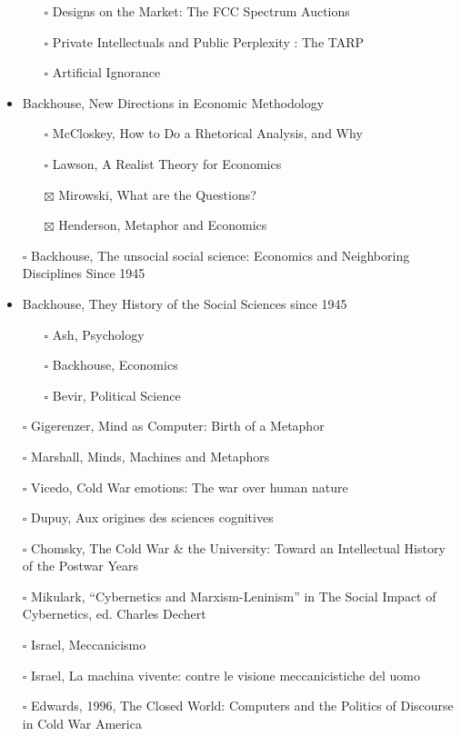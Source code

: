 \documentclass[paper=B6,portrait,twoside=true,twocolumn=false,headinclude=true,footinclude=false,fontsize=12,BCOR=10mm,DIV=calc,pagesize=auto,titlepage=firstiscover,mpinclude=false,headings=normal,headings=twolinechapter,open=right,toc=graduated,chapterprefix=false,numbers=endperiod,parskip=half+]{scrbook}
\theoremstyle{definition}
\begin{document}
\begin{itemize}
\begin{itemize}
\item[{$\square$}] Designs on the Market: The FCC Spectrum Auctions
\item[{$\square$}] Private Intellectuals and Public Perplexity : The TARP
\item[{$\square$}] Artificial Ignorance
\end{itemize}
\item\relax [2/4] Backhouse, New Directions in Economic Methodology
\begin{itemize}
\item[{$\square$}] McCloskey, How to Do a Rhetorical Analysis, and Why
\item[{$\square$}] Lawson, A Realist Theory for Economics
\item[{$\boxtimes$}] Mirowski, What are the Questions?
\item[{$\boxtimes$}] Henderson, Metaphor and Economics
\end{itemize}
\item[{$\square$}] Backhouse, The unsocial social science: Economics and Neighboring Disciplines Since 1945
\item\relax [0/3] Backhouse, They History of the Social Sciences since 1945
\begin{itemize}
\item[{$\square$}] Ash, Psychology
\item[{$\square$}] Backhouse, Economics
\item[{$\square$}] Bevir, Political Science
\end{itemize}
\item[{$\square$}] Gigerenzer, Mind as Computer: Birth of a Metaphor
\item[{$\square$}] Marshall, Minds, Machines and Metaphors
\item[{$\square$}] Vicedo, Cold War emotions: The war over human nature
\item[{$\square$}] Dupuy, Aux origines des sciences cognitives
\item[{$\square$}] Chomsky, The Cold War \& the University: Toward an Intellectual History of the Postwar Years
\item[{$\square$}] Mikulark, ``Cybernetics and Marxism-Leninism'' in The Social Impact of Cybernetics, ed. Charles Dechert
\item[{$\square$}] Israel,  Meccanicismo
\item[{$\square$}] Israel, La machina vivente: contre le visione meccanicistiche del uomo
\item[{$\square$}] Edwards, 1996, The Closed World: Computers and the Politics of Discourse in Cold War America

\end{itemize}
\end{document}
